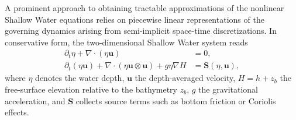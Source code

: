 \documentclass{article}
\newcommand{\1}{\mathds{1}}          %
\theoremstyle{definition}
\begin{document}
\begin{sloppypar}

A prominent approach to obtaining tractable approximations of the nonlinear Shallow Water equations relies on piecewise linear representations of the governing dynamics arising from semi-implicit space-time discretizations. In conservative form, the two-dimensional Shallow Water system reads
\begin{equation}
\begin{aligned}
\partial_t\eta + \nabla \cdot (\eta\mathbf{u}) &= 0, \\
\partial_t (\eta\mathbf{u}) + \nabla \cdot (\eta\mathbf{u} \otimes \mathbf{u}) + g\eta\nabla H &= \mathbf{S}(\eta,\mathbf{u}),
\end{aligned}
\label{eq:SWE_continuous}
\end{equation}
where $\eta$ denotes the water depth, $\mathbf{u}$ the depth-averaged velocity, $H = h + z_b$ the free-surface elevation relative to the bathymetry $z_b$, $g$ the gravitational acceleration, and $\mathbf{S}$ collects source terms such as bottom friction or Coriolis effects.


\end{sloppypar}
\end{document}
